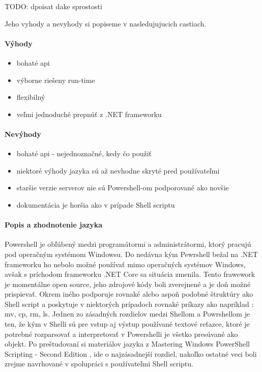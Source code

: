 TODO: dpoisat dake sprostosti

Jeho vyhody a nevyhody si popiseme v nasledujujucich castiach.

\paragraph{Výhody}
\begin{itemize}
	\item bohaté api
	\item výborne riešeny run-time 
	\item flexibilný
	\item veľmi jednoduché prepnúť z .NET frameworku
	\newline
\end{itemize}
\paragraph{Nevýhody}
\begin{itemize}
	\item bohaté api - nejednoznačné, kedy čo použiť
	\item niektoré výhody jazyka sú až nevhodne skryté pred používateľmi
	\item staršie verzie serverov nie sú Powershell-om podporované ako novšie
	\item dokumentácia je horšia ako v prípade Shell scriptu
	\newline
\end{itemize}

\paragraph{Popis a zhodnotenie jazyka}
Powershell je obľúbený medzi programátormi a administrátormi, ktorý pracujú pod operačným systémom Windowsu. Do nedávna kým Pewrshell bežal na .NET frameworku ho nebolo možné používať mimo operačných systémov Windows, avšak s príchodom frameworku .NET Core sa situácia zmenila. Tento frawework je momentálne open source, jeho zdrojové kódy boli zverejnené a je doň možné prispievať. Okrem iného podporuje rovnaké alebo aspoň podobné štruktúry ako Shell script a poskytuje v niektorých prípadoch rovnaké príkazy ako napríklad : mv, cp, rm, ls. Jednen zo zásadných rozdielov medzi Shellom a Powrshellom je ten, že kým v Shelli sú pre vstup aj výstup používané textové reťazce, ktoré je potrebné rozparsovať a interpretovať v Powershelli je všetko presúvané ako objekt. Po preštudovaní si materiálov jazyka z Mastering Windows PowerShell Scripting - Second Edition \cite{psbook}, ide o najzásadnejší rozdiel, nakoľko ostatné veci boli zrejme navrhované v spolupráci s používateľmi Shell scriptu.

